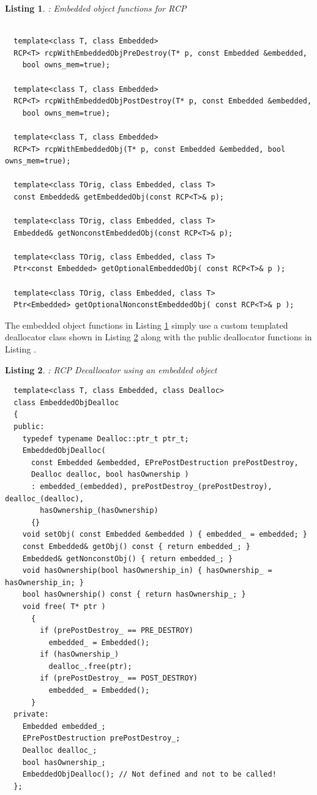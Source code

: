 \documentclass[pdf,ps2pdf,11pt]{SANDreport}
\newtheorem{listing}{Listing}
\begin{document}
\begin{listing}: Embedded object functions for RCP \\
\label{listing:RCP-embedded-obj}
{\small\begin{verbatim}
 
  template<class T, class Embedded>
  RCP<T> rcpWithEmbeddedObjPreDestroy(T* p, const Embedded &embedded,
    bool owns_mem=true);
  
  template<class T, class Embedded>
  RCP<T> rcpWithEmbeddedObjPostDestroy(T* p, const Embedded &embedded,
    bool owns_mem=true);
  
  template<class T, class Embedded>
  RCP<T> rcpWithEmbeddedObj(T* p, const Embedded &embedded, bool owns_mem=true);
  
  template<class TOrig, class Embedded, class T> 
  const Embedded& getEmbeddedObj(const RCP<T>& p);
  
  template<class TOrig, class Embedded, class T>
  Embedded& getNonconstEmbeddedObj(const RCP<T>& p);
  
  template<class TOrig, class Embedded, class T>
  Ptr<const Embedded> getOptionalEmbeddedObj( const RCP<T>& p );
  
  template<class TOrig, class Embedded, class T>
  Ptr<Embedded> getOptionalNonconstEmbeddedObj( const RCP<T>& p );
\end{verbatim}}
\end{listing}

The embedded object functions in Listing
{}\ref{listing:RCP-embedded-obj} simply use a custom templated
deallocator class shown in Listing
{}\ref{listing:RCP-EmbeddedObjDealloc} along with the public
deallocator functions in Listing {}.

\begin{listing}: RCP Decallocator using an embedded object \\
\label{listing:RCP-EmbeddedObjDealloc}
{\small\begin{verbatim}
  template<class T, class Embedded, class Dealloc>
  class EmbeddedObjDealloc
  {
  public:
    typedef typename Dealloc::ptr_t ptr_t;
    EmbeddedObjDealloc(
      const Embedded &embedded, EPrePostDestruction prePostDestroy,
      Dealloc dealloc, bool hasOwnership )
      : embedded_(embedded), prePostDestroy_(prePostDestroy), dealloc_(dealloc),
        hasOwnership_(hasOwnership)
      {}
    void setObj( const Embedded &embedded ) { embedded_ = embedded; }
    const Embedded& getObj() const { return embedded_; }
    Embedded& getNonconstObj() { return embedded_; }
    void hasOwnership(bool hasOwnership_in) { hasOwnership_ = hasOwnership_in; }
    bool hasOwnership() const { return hasOwnership_; }
    void free( T* ptr )
      {
        if (prePostDestroy_ == PRE_DESTROY)
          embedded_ = Embedded();
        if (hasOwnership_)
          dealloc_.free(ptr);
        if (prePostDestroy_ == POST_DESTROY)
          embedded_ = Embedded();
      }
  private:
    Embedded embedded_;
    EPrePostDestruction prePostDestroy_;
    Dealloc dealloc_;
    bool hasOwnership_;
    EmbeddedObjDealloc(); // Not defined and not to be called!
  };
\end{verbatim}}
\end{listing}
\end{document}
